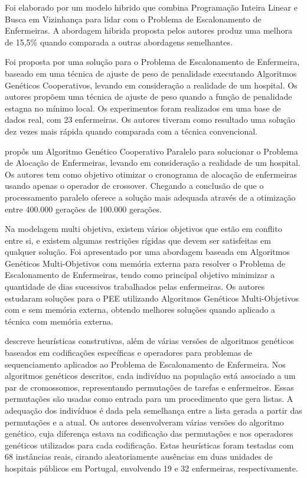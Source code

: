 Foi elaborado por \cite{burke:2010} um modelo hibrido que combina Programação Inteira Linear e Busca em Vizinhança para lidar com o Problema de Escalonamento de Enfermeiras. A abordagem hibrida proposta pelos autores produz uma melhora de 15,5\% quando comparada a outras abordagens semelhantes.

Foi proposta por \cite{ohki:2008} uma solução para o Problema de Escalonamento de Enfermeira, baseado em uma técnica de ajuste de peso de penalidade executando Algoritmos Genéticos Cooperativos, levando em consideração a realidade de um hospital. Os autores propõem uma técnica de ajuste de peso quando a função de penalidade estagna no mínimo local. Os experimentos foram realizados em uma base de dados real, com 23 enfermeiras. Os autores tiveram como resultado uma solução dez vezes mais rápida quando comparada com a técnica convencional. 

\cite{ohki:2008} propôs um Algoritmo Genético Cooperativo Paralelo para solucionar o Problema de Alocação de Enfermeiras, levando em consideração a realidade de um hospital. Os autores tem como objetivo otimizar o cronograma de alocação de enfermeiras usando apenas o operador de crossover. Chegando a conclusão de que o processamento paralelo oferece a solução mais adequada através de a otimização entre 400.000 gerações de 100.000 gerações.

Na modelagem multi objetiva, existem vários objetivos que estão em conflito entre si, e existem algumas restrições rígidas que devem ser satisfeitas em qualquer solução. Foi apresentado por\cite{ahmet:2009} uma abordagem baseada em Algoritmos Genéticos Multi-Objetivos com memória externa para resolver o Problema de Escalonamento de Enfermeiras, tendo como principal objetivo minimizar a quantidade de dias sucessivos trabalhados pelas enfermeiras. Os autores estudaram soluções para o \ac{PEE} utilizando Algoritmos Genéticos Multi-Objetivos com e sem memória externa, obtendo melhores soluções quando aplicado a técnica com memória externa. 

\cite{mozab:2007} descreve  heurísticas construtivas, além de várias versões de algoritmos genéticos baseados em codificações específicas e operadores para problemas de sequenciamento aplicados ao Problema de Escalonamento de Enfermeira. Nos algoritmos genéticos descritos, cada indivíduo na população está associado a um par de cromossomos, representando permutações de tarefas e enfermeiros. Essas permutações são usadas como entrada para um procedimento que gera listas. A adequação dos indivíduos é dada pela semelhança entre a lista gerada a partir das permutações e a atual. Os autores desenvolveram várias versões do algoritmo genético, cuja diferença estava na codificação das permutações e nos operadores genéticos utilizados para cada codificação. Estas heurísticas foram testadas com 68 instâncias reais,  cirando aleatoriamente ausências em duas unidades de hospitais públicos em Portugal, envolvendo 19 e 32 enfermeiras, respectivamente.

